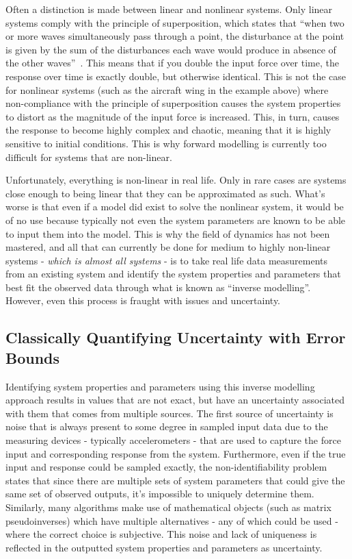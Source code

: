 \documentclass[12pt]{article}
\begin{document}
    Often a distinction is made between linear and nonlinear systems.
    Only linear systems comply with the principle of superposition, which states that ``when two or more waves simultaneously pass through a point, the disturbance at the point is given by the sum of the disturbances each wave would produce in absence of the other waves''~\cite{StudyComSuperposition}.
    This means that if you double the input force over time, the response over time is exactly double, but otherwise identical.
    This is not the case for nonlinear systems (such as the aircraft wing in the example above) where non-compliance with the principle of superposition causes the system properties to distort as the magnitude of the input force is increased.
    This, in turn, causes the response to become highly complex and chaotic, meaning that it is highly sensitive to initial conditions.
    This is why forward modelling is currently too difficult for systems that are non-linear.

    Unfortunately, everything is non-linear in real life.
    Only in rare cases are systems close enough to being linear that they can be approximated as such.
    What's worse is that even if a model did exist to solve the nonlinear system, it would be of no use because typically not even the system parameters are known to be able to input them into the model.
    This is why the field of dynamics has not been mastered, and all that can currently be done for medium to highly non-linear systems - \textit{which is almost all systems} - is to take real life data measurements from an existing system and identify the system properties and parameters that best fit the observed data through what is known as ``inverse modelling''.
    However, even this process is fraught with issues and uncertainty.

    \subsection{Classically Quantifying Uncertainty with Error Bounds}
    Identifying system properties and parameters using this inverse modelling approach results in values that are not exact, but have an uncertainty associated with them that comes from multiple sources.
    The first source of uncertainty is noise that is always present to some degree in sampled input data due to the measuring devices - typically accelerometers - that are used to capture the force input and corresponding response from the system.
    Furthermore, even if the true input and response could be sampled exactly, the non-identifiability problem states that since there are multiple sets of system parameters that could give the same set of observed outputs, it's impossible to uniquely determine them.
    Similarly, many algorithms make use of mathematical objects (such as matrix pseudoinverses) which have multiple alternatives - any of which could be used - where the correct choice is subjective.
    This noise and lack of uniqueness is reflected in the outputted system properties and parameters as uncertainty.
\end{document}
